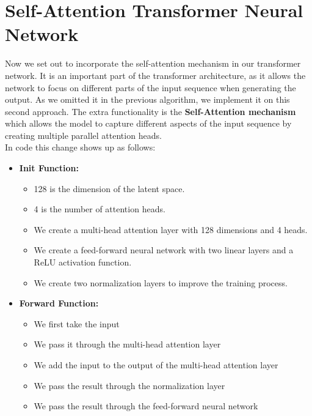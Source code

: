 \documentclass[lettersize,journal]{IEEEtran}
\begin{document}
\section{Self-Attention Transformer Neural Network}
Now we set out to incorporate the self-attention mechanism in our transformer network. It is an 
important part of the transformer architecture, as it allows the network to focus on different
parts of the input sequence when generating the output. As we omitted it in the previous algorithm,
we implement it on this second approach. The extra functionality is the \textbf{Self-Attention mechanism} 
which allows the model to capture different aspects of the input sequence by creating multiple parallel 
attention heads.\\
In code this change shows up as follows:
\begin{itemize}
    \item \textbf{Init Function:}
    \begin{itemize}
        \item 128 is the dimension of the latent space.
        \item 4 is the number of attention heads.
        \item We create a multi-head attention layer with 128 dimensions and 4 heads.
        \item We create a feed-forward neural network with two linear layers and a ReLU activation function.
        \item We create two normalization layers to improve the training process.
    \end{itemize}
    \item \textbf{Forward Function:}
    \begin{itemize}
        \item We first take the input
        \item We pass it through the multi-head attention layer
        \item We add the input to the output of the multi-head attention layer
        \item We pass the result through the normalization layer
        \item We pass the result through the feed-forward neural network
    \end{itemize}
\end{itemize}
\end{document}

